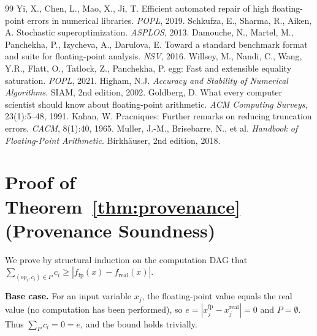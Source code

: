 \documentclass[11pt]{article}
\begin{document}
\begin{thebibliography}{99}
 Yi, X., Chen, L., Mao, X., Ji, T. Efficient automated repair of high floating-point errors in numerical libraries. \emph{POPL}, 2019.
 Schkufza, E., Sharma, R., Aiken, A. Stochastic superoptimization. \emph{ASPLOS}, 2013.
 Damouche, N., Martel, M., Panchekha, P., Izycheva, A., Darulova, E. Toward a standard benchmark format and suite for floating-point analysis. \emph{NSV}, 2016.
 Willsey, M., Nandi, C., Wang, Y.R., Flatt, O., Tatlock, Z., Panchekha, P. egg: Fast and extensible equality saturation. \emph{POPL}, 2021.
 Higham, N.J. \emph{Accuracy and Stability of Numerical Algorithms}. SIAM, 2nd edition, 2002.
 Goldberg, D. What every computer scientist should know about floating-point arithmetic. \emph{ACM Computing Surveys}, 23(1):5--48, 1991.
 Kahan, W. Pracniques: Further remarks on reducing truncation errors. \emph{CACM}, 8(1):40, 1965.
 Muller, J.-M., Brisebarre, N., et al. \emph{Handbook of Floating-Point Arithmetic}. Birkh\"{a}user, 2nd edition, 2018.
\end{thebibliography}

\appendix
\section{Proof of Theorem~\ref{thm:provenance} (Provenance Soundness)}

We prove by structural induction on the computation DAG that $\sum_{(op_i, c_i) \in P} c_i \geq |f_{\text{fp}}(x) - f_{\text{real}}(x)|$.

\textbf{Base case.} For an input variable $x_j$, the floating-point value equals the real value (no computation has been performed), so $e = |x_j^{\text{fp}} - x_j^{\text{real}}| = 0$ and $P = \emptyset$. Thus $\sum_{P} c_i = 0 = e$, and the bound holds trivially.
\end{document}
